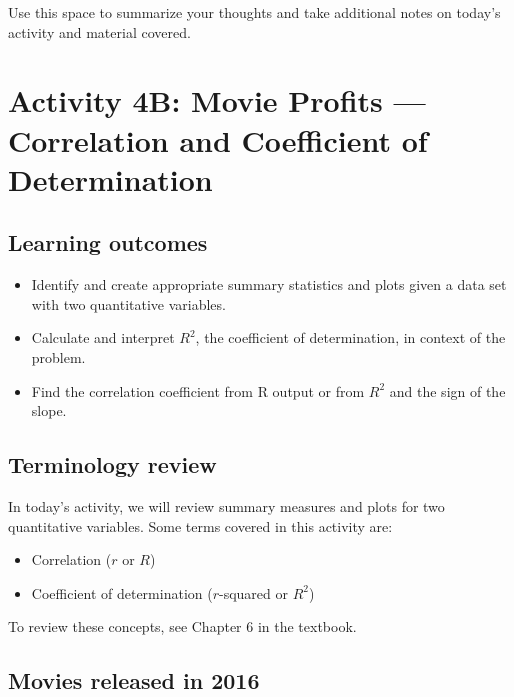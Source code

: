 \documentclass[
]{report}
\begin{document}
Use this space to summarize your thoughts and take additional notes on today's activity and material covered.

\newpage

\hypertarget{activity-4b-movie-profits-correlation-and-coefficient-of-determination}{%
\section{Activity 4B: Movie Profits --- Correlation and Coefficient of Determination}\label{activity-4b-movie-profits-correlation-and-coefficient-of-determination}}


\hypertarget{learning-outcomes-7}{%
\subsection{Learning outcomes}\label{learning-outcomes-7}}

\begin{itemize}
\item
  Identify and create appropriate summary statistics and plots
  given a data set with two quantitative variables.
\item
  Calculate and interpret \(R^2\), the coefficient of determination, in context of the problem.
\item
  Find the correlation coefficient from R output or from \(R^2\) and the sign of the slope.
\end{itemize}

\hypertarget{terminology-review-7}{%
\subsection{Terminology review}\label{terminology-review-7}}

In today's activity, we will review summary measures and plots for two quantitative variables. Some terms covered in this activity are:

\begin{itemize}
\item
  Correlation (\(r\) or \(R\))
\item
  Coefficient of determination (\(r\)-squared or \(R^2\))
\end{itemize}

To review these concepts, see Chapter 6 in the textbook.

\hypertarget{movies-released-in-2016-1}{%
\subsection{Movies released in 2016}\label{movies-released-in-2016-1}}
\end{document}
